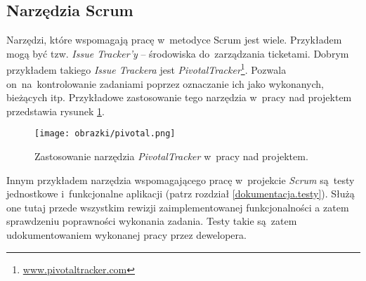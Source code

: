 \subsection{Narzędzia Scrum} \label{scrum.narzedzia}

Narzędzi, które wspomagają pracę w~metodyce Scrum jest wiele. Przykładem mogą być tzw. \textit{Issue Tracker'y} -- środowiska do~zarządzania ticketami. Dobrym przykładem takiego \textit{Issue Trackera} jest \textit{PivotalTracker}\footnote{\url{www.pivotaltracker.com}}. Pozwala on~na~kontrolowanie zadaniami poprzez oznaczanie ich jako wykonanych, bieżących itp. Przykładowe zastosowanie tego narzędzia w~pracy nad projektem przedstawia rysunek \ref{fig.rysunek.pivotal}.

\begin{figure}[!t]
\centering
\texttt{[image: obrazki/pivotal.png]}
\caption{Zastosowanie narzędzia \textit{PivotalTracker} w~pracy nad projektem. \cite{pivotaltracker}}
\label{fig.rysunek.pivotal}
\end{figure}

Innym przykładem narzędzia wspomagającego pracę w~projekcie \textit{Scrum} są~testy jednostkowe i~funkcjonalne aplikacji (patrz rozdział \ref{dokumentacja.testy}). Służą one tutaj przede wszystkim rewizji zaimplementowanej funkcjonalności a zatem sprawdzeniu poprawności wykonania zadania. Testy takie są~zatem udokumentowaniem wykonanej pracy przez dewelopera.
